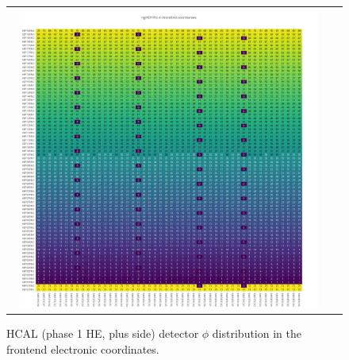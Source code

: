 \begin{figure}[htb]
 \begin{center}
  \begin{tabular}{cc}
   \includegraphics[angle=0,width=0.95\textwidth]{figures/appendix/ngHEP_Phi_in_FrontEnd.png}
  \end{tabular}
	\caption{HCAL (phase 1 HE, plus side) detector $\phi$ distribution in the frontend electronic coordinates.}
  \label{fig:lmapngHEPPhiFEC}
 \end{center}
\end{figure}
\clearpage

